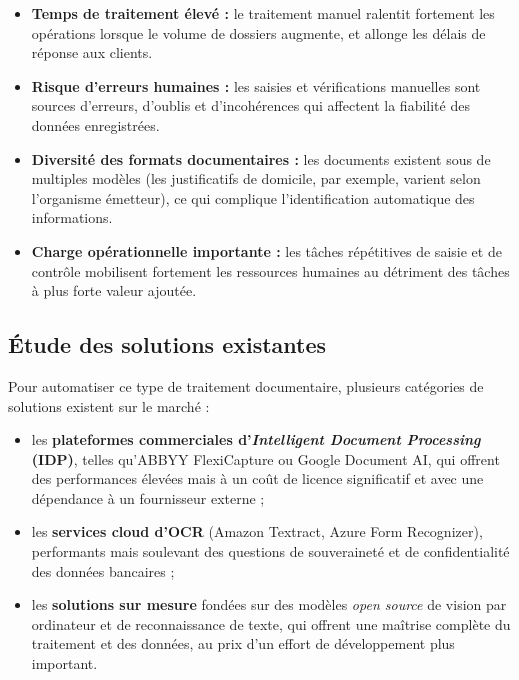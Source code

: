 \begin{itemize}
    \item \textbf{Temps de traitement élevé :} le traitement manuel ralentit
    fortement les opérations lorsque le volume de dossiers augmente, et
    allonge les délais de réponse aux clients.
    \item \textbf{Risque d'erreurs humaines :} les saisies et vérifications
    manuelles sont sources d'erreurs, d'oublis et d'incohérences qui
    affectent la fiabilité des données enregistrées.
    \item \textbf{Diversité des formats documentaires :} les documents
    existent sous de multiples modèles (les justificatifs de domicile, par
    exemple, varient selon l'organisme émetteur), ce qui complique
    l'identification automatique des informations.
    \item \textbf{Charge opérationnelle importante :} les tâches répétitives
    de saisie et de contrôle mobilisent fortement les ressources humaines au
    détriment des tâches à plus forte valeur ajoutée.
\end{itemize}

\subsection*{Étude des solutions existantes}

Pour automatiser ce type de traitement documentaire, plusieurs catégories de
solutions existent sur le marché :

\begin{itemize}
    \item les \textbf{plateformes commerciales d'\textit{Intelligent Document
    Processing} (IDP)}, telles qu'ABBYY FlexiCapture ou Google Document AI,
    qui offrent des performances élevées mais à un coût de licence
    significatif et avec une dépendance à un fournisseur externe ;
    \item les \textbf{services cloud d'OCR} (Amazon Textract, Azure Form
    Recognizer), performants mais soulevant des questions de souveraineté et
    de confidentialité des données bancaires ;
    \item les \textbf{solutions sur mesure} fondées sur des modèles
    \textit{open source} de vision par ordinateur et de reconnaissance de
    texte, qui offrent une maîtrise complète du traitement et des données,
    au prix d'un effort de développement plus important.
\end{itemize}

